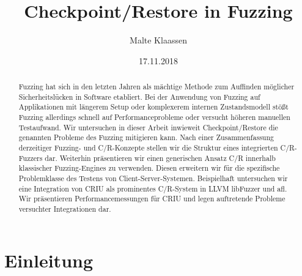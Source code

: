 \documentclass[a4paper]{article}
\begin{document}
\author{Malte Klaassen}
\date{17.11.2018}
\title{Checkpoint/Restore in Fuzzing}

\maketitle

\begin{abstract}
    Fuzzing hat sich in den letzten Jahren als mächtige Methode zum Auffinden möglicher Sicherheitslücken in Software etabliert. 
    Bei der Anwendung von Fuzzing auf Applikationen mit längerem Setup oder komplexerem internen Zustandsmodell stößt Fuzzing allerdings schnell auf Performanceprobleme oder versucht höheren manuellen Testaufwand. 
    Wir untersuchen in dieser Arbeit inwieweit Checkpoint/Restore die genannten Probleme des Fuzzing mitigieren kann. 
    Nach einer Zusammenfassung derzeitiger Fuzzing- und C/R-Konzepte stellen wir die Struktur eines integrierten C/R-Fuzzers dar.
    Weiterhin präsentieren wir einen generischen Ansatz C/R innerhalb klassischer Fuzzing-Engines zu verwenden. Diesen erweitern wir für die spezifische Problemklasse des Testens von Client-Server-Systemen. 
    Beispielhaft untersuchen wir eine Integration von CRIU als prominentes C/R-System in LLVM libFuzzer und afl.
    Wir präsentieren Performancemessungen für CRIU und legen auftretende Probleme versuchter Integrationen dar.
\end{abstract}

\tableofcontents

\section{Einleitung}
\end{document}
